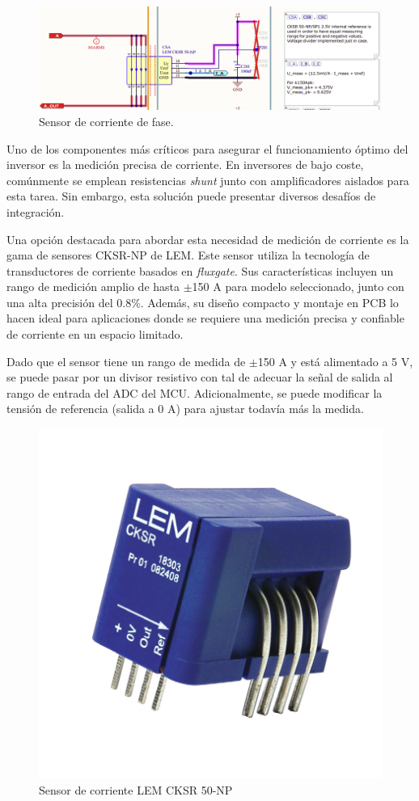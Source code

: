 \begin{figure}[H]
	\centering
	\includegraphics[width=0.8\linewidth]{fig/Imeas-sch}
	\caption{Sensor de corriente de fase.}
\end{figure}

Uno de los componentes más críticos para asegurar el funcionamiento óptimo del inversor es la medición precisa de corriente. En inversores de bajo coste, comúnmente se emplean resistencias \textit{shunt} junto con amplificadores aislados para esta tarea. Sin embargo, esta solución puede presentar diversos desafíos de integración.

Una opción destacada para abordar esta necesidad de medición de corriente es la gama de sensores CKSR-NP de LEM. Este sensor utiliza la tecnología de transductores de corriente basados en \textit{fluxgate}. Sus características incluyen un rango de medición amplio de hasta $\pm$150 A para modelo seleccionado, junto con una alta precisión del 0.8\%. Además, su diseño compacto y montaje en PCB lo hacen ideal para aplicaciones donde se requiere una medición precisa y confiable de corriente en un espacio limitado.

Dado que el sensor tiene un rango de medida de $\pm$150 A y está alimentado a 5 V, se puede pasar por un divisor resistivo con tal de adecuar la señal de salida al rango de entrada del ADC del MCU. Adicionalmente, se puede modificar la tensión de referencia (salida a 0 A) para ajustar todavía más la medida.

\begin{figure}[H]
	\centering
	\includegraphics[width=0.5\linewidth]{fig/cksr50}
	\caption{Sensor de corriente LEM CKSR 50-NP}
\end{figure}


